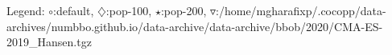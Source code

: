 Legend: {\color{NavyBlue}$\circ$}:default, {\color{Magenta}$\diamondsuit$}:pop-100, {\color{Orange}$\star$}:pop-200, {\color{CornflowerBlue}$\triangledown$}:/home/mgharafixp/.cocopp/data-archives/numbbo.github.io/data-archive/data-archive/bbob/2020/CMA-ES-2019\_Hansen.tgz